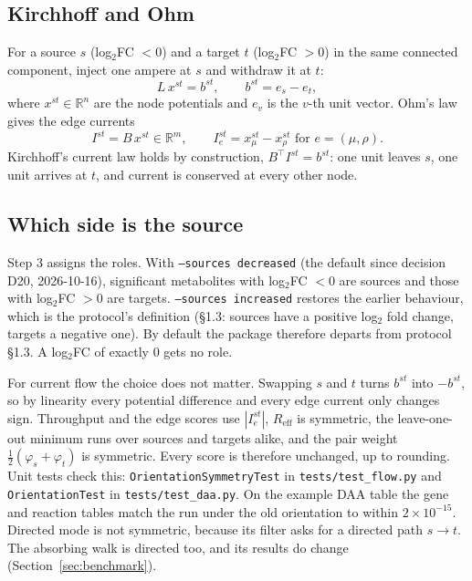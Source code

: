 \documentclass[11pt]{article}
\newcommand{\code}[1]{\texttt{#1}}
\newcommand{\R}{\mathbb{R}}
\newcommand{\Reff}{R_{\mathrm{eff}}}
\begin{document}
\subsection{Kirchhoff and Ohm}
For a source $s$ (log$_2$FC $<0$) and a target $t$ (log$_2$FC $>0$) in the same
connected component, inject one ampere at $s$ and withdraw it at $t$:
\begin{equation}
  L\,x^{st} = b^{st},\qquad b^{st} = e_s - e_t,
  \label{eq:kirchhoff}
\end{equation}
where $x^{st}\in\R^n$ are the node potentials and $e_v$ is the $v$-th unit vector.
Ohm's law gives the edge currents
\begin{equation}
  I^{st} = B\,x^{st}\in\R^{m},
  \qquad I^{st}_e = x^{st}_\mu - x^{st}_\rho \text{ for } e=(\mu,\rho).
  \label{eq:ohm}
\end{equation}
Kirchhoff's current law holds by construction, $B^{\top}I^{st} = b^{st}$: one unit
leaves $s$, one unit arrives at $t$, and current is conserved at every other node.

\subsection{Which side is the source}\label{sec:orientation}
Step 3 assigns the roles. With \code{--sources decreased} (the default since
decision D20, 2026-10-16), significant metabolites with log$_2$FC $<0$ are sources
and those with log$_2$FC $>0$ are targets. \code{--sources increased} restores the
earlier behaviour, which is the protocol's definition (\S1.3: sources have a
positive log$_2$ fold change, targets a negative one). By default the package
therefore departs from protocol \S1.3. A log$_2$FC of exactly $0$ gets no role.

For current flow the choice does not matter. Swapping $s$ and $t$ turns $b^{st}$
into $-b^{st}$, so by linearity every potential difference and every edge current
only changes sign. Throughput and the edge scores use $|I^{st}_e|$, $\Reff$ is
symmetric, the leave-one-out minimum runs over sources and targets alike, and the
pair weight $\tfrac12(\varphi_s+\varphi_t)$ is symmetric. Every score is therefore
unchanged, up to rounding. Unit tests check this:
\code{OrientationSymmetryTest} in \code{tests/test\_flow.py} and
\code{OrientationTest} in \code{tests/test\_daa.py}. On the example DAA table the gene and
reaction tables match the run under the old orientation to within $2\times10^{-15}$.
Directed mode is not symmetric, because its filter asks for a directed path
$s\to t$. The absorbing walk is directed too, and its results do change
(Section~\ref{sec:benchmark}).
\end{document}
